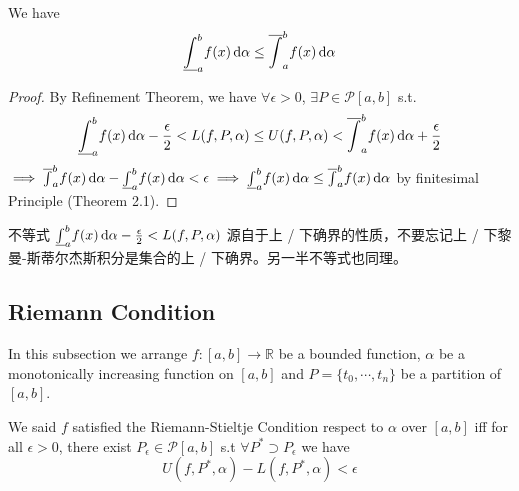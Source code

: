 \documentclass[
	UTF-8,
	11pt, %
	a4paper, %
]{LegrandOrangeBook}
\begin{document}
    \begin{theorem}
        We have 
        $$
            \underline{\int}_{a}^{b}f(x) \, \mathrm{d} \alpha \leq \overline{\int}_{a}^{b}f(x) \, \mathrm{d} \alpha
        $$

    \end{theorem}

    \begin{proof}
        By Refinement Theorem, we have $\forall \epsilon >0 $, $\exists P \in \mathcal{P}[a,b]$ s.t.
        $$
        \underline{\int}_{a}^{b}f(x) \, \mathrm{d} \alpha - {\epsilon \over 2} < L(f , P, \alpha) \leq U(f , P, \alpha) <\overline{\int}_{a}^{b}f(x) \, \mathrm{d} \alpha  + {\epsilon \over 2}
        $$
        $\implies \overline{\int}_{a}^{b}f(x) \, \mathrm{d} \alpha - \underline{\int}_{a}^{b}f(x) \, \mathrm{d} \alpha < \epsilon \implies \underline{\int}_{a}^{b}f(x) \, \mathrm{d} \alpha \leq \overline{\int}_{a}^{b}f(x) \, \mathrm{d} \alpha$ 
        by finitesimal Principle (Theorem 2.1).
    \end{proof}

    \begin{remark}
        不等式
        $
        \underline{\int}_{a}^{b}f(x) \, \mathrm{d} \alpha - {\epsilon \over 2} < L(f , P, \alpha)
        $
        源自于上 / 下确界的性质，不要忘记上 / 下黎曼-斯蒂尔杰斯积分是集合的上 / 下确界。另一半不等式也同理。
    \end{remark}

    \newpage

    \subsection{Riemann Condition}

        In this subsection we arrange $f: [a, b] \to \mathbb{R} $ be a bounded function,
        $\alpha$ be a monotonically increasing function on $[a, b]$ and $P=\{t_0,\cdots, t_n\}$ 
        be a partition of $[a,b]$.

    \begin{definition}
    
        We said $f$ satisfied the Riemann-Stieltje Condition respect to $\alpha$ over $[a,b]$ iff 
        for all  $\epsilon > 0$, 
        there exist $P_{\epsilon} \in \mathcal{P}[a,b]$ s.t $\forall P^{*} \supset P_{\epsilon}$ we have
        $$
            U(f,P^{*},\alpha) - L(f,P^{*},\alpha) < \epsilon
        $$

    \end{definition}
\end{document}
